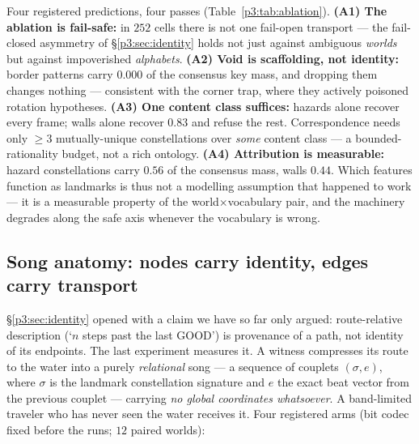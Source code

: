 \documentclass{article}
\begin{document}
Four registered predictions, four passes (Table~\ref{p3:tab:ablation}).
\textbf{(A1) The ablation is fail-safe:} in $252$ cells there is not
one fail-open transport --- the fail-closed asymmetry of
\S\ref{p3:sec:identity} holds not just against ambiguous \emph{worlds}
but against impoverished \emph{alphabets}. \textbf{(A2) Void is
scaffolding, not identity:} border patterns carry $0.000$ of the
consensus key mass, and dropping them changes nothing --- consistent
with the corner trap, where they actively poisoned rotation
hypotheses. \textbf{(A3) One content class suffices:} hazards alone
recover every frame; walls alone recover $0.83$ and refuse the rest.
Correspondence needs only $\ge 3$ mutually-unique constellations over
\emph{some} content class --- a bounded-rationality budget, not a rich
ontology. \textbf{(A4) Attribution is measurable:} hazard
constellations carry $0.56$ of the consensus mass, walls $0.44$.
Which features function as landmarks is thus not a modelling
assumption that happened to work --- it is a measurable property of
the world$\times$vocabulary pair, and the machinery degrades along
the safe axis whenever the vocabulary is wrong.

\subsection{Song anatomy: nodes carry identity, edges carry transport}
\label{p3:sec:anatomy}

\S\ref{p3:sec:identity} opened with a claim we have so far only argued:
route-relative description (`$n$ steps past the last GOOD') is
provenance of a path, not identity of its endpoints. The last
experiment measures it. A witness compresses its route to the water
into a purely \emph{relational} song --- a sequence of couplets
$(\sigma, e)$, where $\sigma$ is the landmark constellation signature
and $e$ the exact beat vector from the previous couplet --- carrying
\emph{no global coordinates whatsoever}. A band-limited traveler who
has never seen the water receives it. Four registered arms (bit codec
fixed before the runs; $12$ paired worlds):
\end{document}
